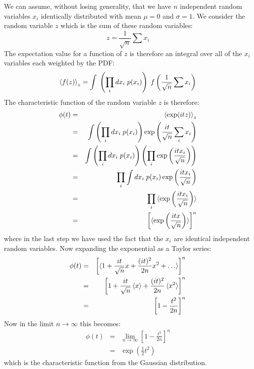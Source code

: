 \documentclass[12pt,oneside]{book}
\begin{document}
We can assume, without losing generality, that we have $n$ independent random variables $x_i$ identically distributed with mean $\mu=0$ and $\sigma=1$.  We consider the random variable $z$ which is the sum of these random variables:
\begin{displaymath}
z = \frac{1}{\sqrt{n}}\sum x_i 
\end{displaymath}
The expectation value for a function of $z$ is therefore an integral over all of the $x_i$ variables each weighted by the PDF:
\begin{equation}
\braket{f(z)}_z = \int \; \left( \prod_i dx_i \; p(x_i) \right) \; f\left( \frac{1}{\sqrt{n}}\sum x_i \right) 
\end{equation} 
 The characteristic function of the random variable $z$ is therefore:
\begin{eqnarray*}
\phi(t) &=& \braket{\exp(itz)}_z \\
           &=& \int \left( \prod_i dx_i \; p(x_i) \right)  \exp\left( \frac{it}{\sqrt{n}}\sum_i x_i \right) \\
           &=& \int \left( \prod_i dx_i \; p(x_i) \right)  \left( \prod_i \exp\left(\frac{itx_i}{\sqrt{n}}\right) \right)\\           
           &=& \prod_i \int dx_i \; p(x_i) \exp\left(\frac{itx_i}{\sqrt{n}}\right) \\                      
           &=& \prod_i \braket{\exp\left(\frac{itx_i}{\sqrt{n}}\right)} \\
           &=& \left[\braket{\exp\left(\frac{itx}{\sqrt{n}}\right)}\right]^n
\end{eqnarray*}
where in the last step we have used the fact that the $x_i$ are identical independent random variables.  Now expanding the exponential as a Taylor series:
\begin{eqnarray*}
\phi(t) &=& \left[\braket{1 + \frac{it}{\sqrt{n}}x+\frac{(it)^2}{2n}x^2+\ldots}\right]^n\\
&=& \left[1 + \frac{it}{\sqrt{n}}\braket{x}+\frac{(it)^2}{2n}\braket{x^2}\right]^n \\
&=& \left[1 -\frac{t^2}{2n}\right]^n
\end{eqnarray*}
 Now in the limit $n \to \infty$ this becomes:
\begin{eqnarray*}
\phi(t) &=& \lim_{n \to \infty} \left[1 -\frac{t^2}{2n}\right]^n \\
          &=& \exp\left( \frac{1}{2}t^2\right)
\end{eqnarray*}
which is the characteristic function from the Gaussian distribution.
\end{document}
